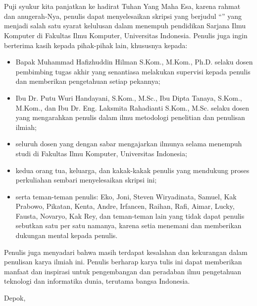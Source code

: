 \chapter*{\kataPengantar}
\pagestyle{first-pages}

Puji syukur kita panjatkan ke hadirat Tuhan Yang Maha Esa, karena rahmat dan anugerah-Nya, penulis dapat menyelesaikan skripsi yang berjudul “\judul” yang menjadi salah satu syarat kelulusan dalam menempuh pendidikan Sarjana Ilmu Komputer di  Fakultas Ilmu Komputer, Universitas Indonesia. Penulis juga ingin berterima kasih kepada pihak-pihak lain, khususnya kepada:

\begin{itemize}
    \setlength\itemsep{-0.5em}
    \item Bapak Muhammad Hafizhuddin Hilman S.Kom., M.Kom., Ph.D. selaku dosen pembimbing tugas akhir yang senantiasa melakukan supervisi kepada penulis dan memberikan pengetahuan setiap pekannya;
    \item Ibu Dr. Putu Wuri Handayani, S.Kom., M.Sc., Ibu Dipta Tanaya, S.Kom., M.Kom., dan Ibu Dr. Eng. Laksmita Rahadianti S.Kom., M.Sc. selaku dosen yang mengarahkan penulis dalam ilmu metodologi penelitian dan penulisan ilmiah;
    \item seluruh dosen yang dengan sabar mengajarkan ilmunya selama menempuh studi di Fakultas Ilmu Komputer, Universitas Indonesia;
    \item kedua orang tua, keluarga, dan kakak-kakak penulis yang mendukung proses perkuliahan sembari menyelesaikan skripsi ini;
    \item serta teman-teman penulis: Eko, Joni, Steven Wiryadinata, Samuel, Kak Prabowo, Pikatan, Kenta, Andre, Irfancen, Raihan, Rafi, Aimar, Lucky, Fausta, Novaryo, Kak Rey, dan teman-teman lain yang tidak dapat penulis sebutkan satu per satu namanya, karena setia menemani dan memberikan dukungan mental kepada penulis.
\end{itemize}

Penulis juga menyadari bahwa masih terdapat kesalahan dan kekurangan dalam penulisan karya ilmiah ini. Penulis berharap karya tulis ini dapat memberikan manfaat dan inspirasi untuk pengembangan dan peradaban ilmu pengetahuan teknologi dan informatika dunia, terutama bangsa Indonesia.

\vspace*{0.1cm}
\begin{flushright}
Depok, \tanggalSiapSidang\\[0.1cm]
\vspace*{1.5cm}
\penulis

\end{flushright}
